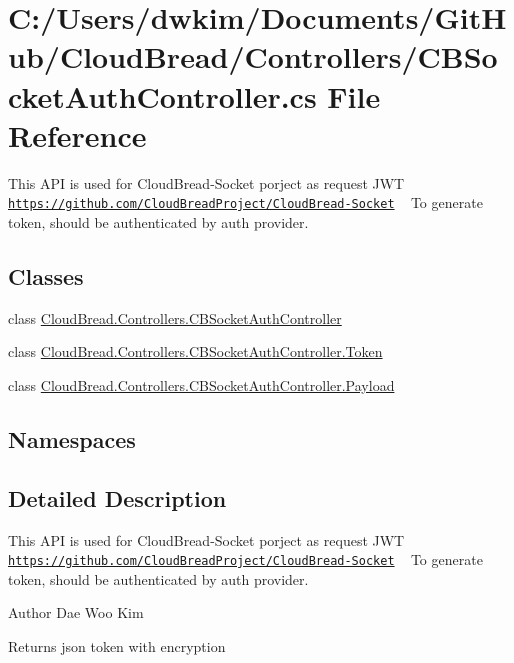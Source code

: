 \hypertarget{a00153}{}\section{C\+:/\+Users/dwkim/\+Documents/\+Git\+Hub/\+Cloud\+Bread/\+Controllers/\+C\+B\+Socket\+Auth\+Controller.cs File Reference}
\label{a00153}


This A\+PI is used for Cloud\+Bread-\/\+Socket porject as request J\+WT ~\newline
\href{https://github.com/CloudBreadProject/CloudBread-Socket}{\tt https\+://github.\+com/\+Cloud\+Bread\+Project/\+Cloud\+Bread-\/\+Socket} ~\newline
To generate token, should be authenticated by auth provider.  


\subsection*{Classes}
\begin{DoxyCompactItemize}
\item 
class \hyperlink{a00041}{Cloud\+Bread.\+Controllers.\+C\+B\+Socket\+Auth\+Controller}
\item 
class \hyperlink{a00107}{Cloud\+Bread.\+Controllers.\+C\+B\+Socket\+Auth\+Controller.\+Token}
\item 
class \hyperlink{a00082}{Cloud\+Bread.\+Controllers.\+C\+B\+Socket\+Auth\+Controller.\+Payload}
\end{DoxyCompactItemize}
\subsection*{Namespaces}
\begin{DoxyCompactItemize}
\end{DoxyCompactItemize}


\subsection{Detailed Description}
This A\+PI is used for Cloud\+Bread-\/\+Socket porject as request J\+WT ~\newline
\href{https://github.com/CloudBreadProject/CloudBread-Socket}{\tt https\+://github.\+com/\+Cloud\+Bread\+Project/\+Cloud\+Bread-\/\+Socket} ~\newline
To generate token, should be authenticated by auth provider. 

\begin{DoxyAuthor}{Author}
Dae Woo Kim 
\end{DoxyAuthor}
\begin{DoxyReturn}{Returns}
json token with encryption 
\end{DoxyReturn}
